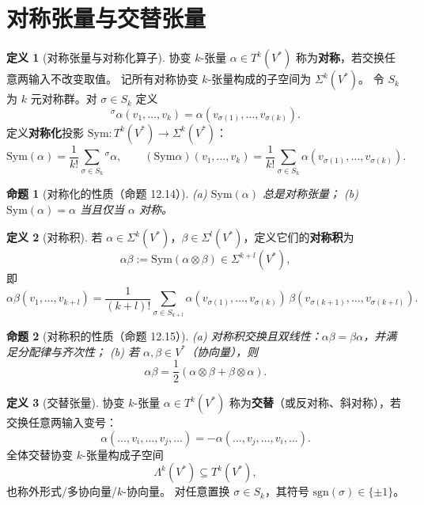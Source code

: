 \documentclass[11pt]{article}
\theoremstyle{definition}
\newtheorem{definition}{定义}[section]
\theoremstyle{plain}
\newtheorem{proposition}{命题}[section]
\newcommand{\Sym}{\mathrm{Sym}}
\newcommand{\sgn}{\mathrm{sgn}}
\newcommand{\ot}{\otimes}
\begin{document}
\section{对称张量与交替张量}

\begin{definition}[对称张量与对称化算子]
协变 $k$-张量 $\alpha\in T^k(V^*)$ 称为\textbf{对称}，若交换任意两输入不改变取值。
记所有对称协变 $k$-张量构成的子空间为 $\Sigma^k(V^*)$。
令 $S_k$ 为 $k$ 元对称群。对 $\sigma\in S_k$ 定义
\[
{}^\sigma\alpha(v_1,\dots,v_k)=\alpha(v_{\sigma(1)},\dots,v_{\sigma(k)}).
\]
定义\textbf{对称化}投影 $\Sym:T^k(V^*)\to \Sigma^k(V^*)$：
\[
\Sym(\alpha)=\frac1{k!}\sum_{\sigma\in S_k} {}^\sigma\alpha,
\qquad
(\Sym\alpha)(v_1,\dots,v_k)=\frac1{k!}\sum_{\sigma\in S_k}\alpha(v_{\sigma(1)},\dots,v_{\sigma(k)}).
\]
\end{definition}

\begin{proposition}[对称化的性质（命题 12.14）]
(a) $\Sym(\alpha)$ 总是对称张量；\quad
(b) $\Sym(\alpha)=\alpha$ 当且仅当 $\alpha$ 对称。
\end{proposition}

\begin{definition}[对称积]
若 $\alpha\in \Sigma^k(V^*)$，$\beta\in \Sigma^l(V^*)$，定义它们的\textbf{对称积}为
\[
\alpha\beta:=\Sym(\alpha\ot\beta)\in \Sigma^{k+l}(V^*),
\]
即
\[
\alpha\beta(v_1,\dots,v_{k+l})
=\frac1{(k+l)!}\sum_{\sigma\in S_{k+l}}
\alpha(v_{\sigma(1)},\dots,v_{\sigma(k)})\,
\beta(v_{\sigma(k+1)},\dots,v_{\sigma(k+l)}).
\]
\end{definition}

\begin{proposition}[对称积的性质（命题 12.15）]
(a) 对称积交换且双线性：$\alpha\beta=\beta\alpha$，并满足分配律与齐次性；\quad
(b) 若 $\alpha,\beta\in V^*$（协向量），则
\[
\alpha\beta=\frac12(\alpha\ot\beta+\beta\ot\alpha).
\]
\end{proposition}

\begin{definition}[交替张量]
协变 $k$-张量 $\alpha\in T^k(V^*)$ 称为\textbf{交替}（或反对称、斜对称），若交换任意两输入变号：
\[
\alpha(\dots,v_i,\dots,v_j,\dots)=-\alpha(\dots,v_j,\dots,v_i,\dots).
\]
全体交替协变 $k$-张量构成子空间
\[
\Lambda^k(V^*)\subseteq T^k(V^*),
\]
也称外形式/多协向量/$k$-协向量。
对任意置换 $\sigma\in S_k$，其符号 $\sgn(\sigma)\in\{\pm1\}$。
\end{definition}
\end{document}
